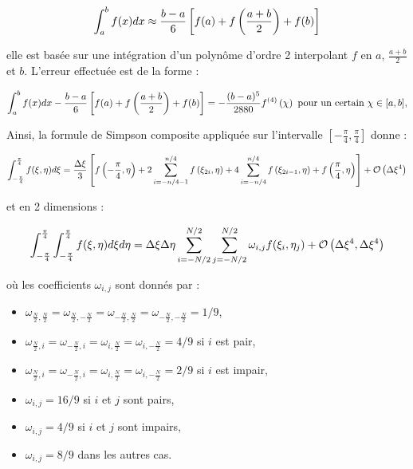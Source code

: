 \begin{equation}
\displaystyle\int_a^b f(x)dx \approx \dfrac{b-a}{6} \left[ f(a)+f\left(\dfrac{a+b}{2}\right) + f(b) \right]
\end{equation}

elle est basée sur une intégration d'un polynôme d'ordre 2 interpolant $f$ en $a$, $\frac{a+b}{2}$ et $b$.
L'erreur effectuée est de la forme :

\begin{equation}
\displaystyle\int_a^b f(x)dx - \dfrac{b-a}{6} \left[ f(a)+f\left(\dfrac{a+b}{2}\right) + f(b) \right] = - \dfrac{(b-a)^5}{2880}f^{(4)}\left( \chi \right) \text{ pour un certain } \chi \in [a,b],
\end{equation}

Ainsi, la formule de Simpson composite appliquée sur l'intervalle $\left[ - \frac{\pi}{4}, \frac{\pi}{4} \right]$ donne :

\begin{equation}
\displaystyle\int_{-\frac{\pi}{4}}^{\frac{\pi}{4}} f(\xi, \eta) d\xi = \dfrac{\Delta \xi}{3} \left[ f\left( - \dfrac{\pi}{4}, \eta \right) + 2 \displaystyle\sum\limits_{i=-n/4-1}^{n/4} f\left( \xi_{2i}, \eta \right) + 4\displaystyle\sum\limits_{i=-n/4}^{n/4} f\left( \xi_{2i-1}, \eta \right) + f \left( \dfrac{\pi}{4}, \eta \right) \right] + \mathcal{O}\left( \Delta \xi^4 \right)
\end{equation}

et en 2 dimensions :

\begin{equation}
\displaystyle\int_{-\frac{\pi}{4}}^{\frac{\pi}{4}} \displaystyle\int_{-\frac{\pi}{4}}^{\frac{\pi}{4}} f(\xi, \eta) d\xi  d\eta= \Delta\xi \Delta \eta \displaystyle\sum\limits_{i=-N/2}^{N/2}\displaystyle\sum\limits_{j=-N/2}^{N/2} \omega_{i,j} f(\xi_i, \eta_j) + \mathcal{O}\left( \Delta \xi^4, \Delta \xi^4 \right)
\label{eq:simpson 2d}
\end{equation}

où les coefficients $\omega_{i,j}$ sont donnés par :
\begin{itemize}
\item $\omega_{\frac{N}{2},\frac{N}{2}}=\omega_{\frac{N}{2},-\frac{N}{2}}=\omega_{-\frac{N}{2},\frac{N}{2}}=\omega_{-\frac{N}{2},-\frac{N}{2}}=1/9$,
\item $\omega_{\frac{N}{2},i}=\omega_{-\frac{N}{2},i}=\omega_{i,\frac{N}{2}}=\omega_{i,-\frac{N}{2}}=4/9$ si $i$ est pair,
\item $\omega_{\frac{N}{2},i}=\omega_{-\frac{N}{2},i}=\omega_{i,\frac{N}{2}}=\omega_{i,-\frac{N}{2}}=2/9$ si $i$ est impair,
\item $\omega_{i,j}=16/9$ si $i$ et $j$ sont pairs,
\item $\omega_{i,j}=4/9$ si $i$ et $j$ sont impairs,
\item $\omega_{i,j}=8/9$ dans les autres cas.
\end{itemize}


